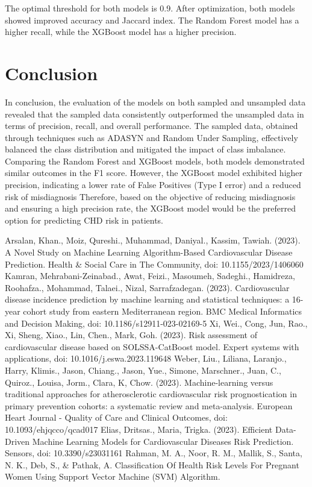 \documentclass[conference]{IEEEtran}
\begin{document}
  The optimal threshold for both models is 0.9. After optimization, both models showed improved accuracy and Jaccard index. The Random Forest model has a higher recall, while the XGBoost model has a higher precision.

\section{Conclusion}
In conclusion, the evaluation of the models on both sampled and unsampled data revealed that the sampled data consistently outperformed the unsampled data in terms of precision, recall, and overall performance. The sampled data, obtained through techniques such as ADASYN and Random Under Sampling, effectively balanced the class distribution and mitigated the impact of class imbalance.
Comparing the Random Forest and XGBoost models, both models demonstrated similar outcomes in the F1 score. However, the XGBoost model exhibited higher precision, indicating a lower rate of False Positives (Type I error) and a reduced risk of misdiagnosis Therefore, based on the objective of reducing misdiagnosis and ensuring a high precision rate, the XGBoost model would be the preferred option for predicting CHD risk in patients.

\begin{thebibliography}{00}
 Arsalan, Khan., Moiz, Qureshi., Muhammad, Daniyal., Kassim, Tawiah. (2023). A Novel Study on Machine Learning Algorithm-Based Cardiovascular Disease Prediction. Health \& Social Care in The Community,  doi: 10.1155/2023/1406060
 Kamran, Mehrabani-Zeinabad., Awat, Feizi., Masoumeh, Sadeghi., Hamidreza, Roohafza., Mohammad, Talaei., Nizal, Sarrafzadegan. (2023). Cardiovascular disease incidence prediction by machine learning and statistical techniques: a 16-year cohort study from eastern Mediterranean region. BMC Medical Informatics and Decision Making,  doi: 10.1186/s12911-023-02169-5
 Xi, Wei., Cong, Jun, Rao., Xi, Sheng, Xiao., Lin, Chen., Mark, Goh. (2023). Risk assessment of cardiovascular disease based on SOLSSA-CatBoost model. Expert systems with applications,  doi: 10.1016/j.eswa.2023.119648
 Weber, Liu., Liliana, Laranjo., Harry, Klimis., Jason, Chiang., Jason, Yue., Simone, Marschner., Juan, C., Quiroz., Louisa, Jorm., Clara, K, Chow. (2023). Machine-learning versus traditional approaches for atherosclerotic cardiovascular risk prognostication in primary prevention cohorts: a systematic review and meta-analysis. European Heart Journal - Quality of Care and Clinical Outcomes,  doi: 10.1093/ehjqcco/qcad017
 Elias, Dritsas., Maria, Trigka. (2023). Efficient Data-Driven Machine Learning Models for Cardiovascular Diseases Risk Prediction. Sensors,  doi: 10.3390/s23031161
 Rahman, M. A., Noor, R. M., Mallik, S., Santa, N. K., Deb, S., \& Pathak, A. Classification Of Health Risk Levels For Pregnant Women Using Support Vector Machine (SVM) Algorithm.

\end{thebibliography}
\end{document}
